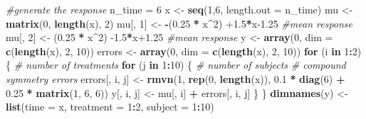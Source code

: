 \documentclass[
]{article}
\newenvironment{Shaded}{\begin{snugshade}}{\end{snugshade}}
\newcommand{\CommentTok}[1]{\textcolor[rgb]{0.56,0.35,0.01}{\textit{#1}}}
\newcommand{\ControlFlowTok}[1]{\textcolor[rgb]{0.13,0.29,0.53}{\textbf{#1}}}
\newcommand{\DataTypeTok}[1]{\textcolor[rgb]{0.13,0.29,0.53}{#1}}
\newcommand{\DecValTok}[1]{\textcolor[rgb]{0.00,0.00,0.81}{#1}}
\newcommand{\FloatTok}[1]{\textcolor[rgb]{0.00,0.00,0.81}{#1}}
\newcommand{\KeywordTok}[1]{\textcolor[rgb]{0.13,0.29,0.53}{\textbf{#1}}}
\newcommand{\NormalTok}[1]{#1}
\newcommand{\OperatorTok}[1]{\textcolor[rgb]{0.81,0.36,0.00}{\textbf{#1}}}
\newcommand{\StringTok}[1]{\textcolor[rgb]{0.31,0.60,0.02}{#1}}
\begin{document}
\begin{Shaded}
\begin{Highlighting}[]
\CommentTok{#generate the response}
\NormalTok{n_time =}\StringTok{ }\DecValTok{6}
\NormalTok{ x <-}\StringTok{ }\KeywordTok{seq}\NormalTok{(}\DecValTok{1}\NormalTok{,}\DecValTok{6}\NormalTok{, }\DataTypeTok{length.out =}\NormalTok{ n_time)}
\NormalTok{ mu <-}\StringTok{ }\KeywordTok{matrix}\NormalTok{(}\DecValTok{0}\NormalTok{, }\KeywordTok{length}\NormalTok{(x), }\DecValTok{2}\NormalTok{)}
\NormalTok{ mu[, }\DecValTok{1}\NormalTok{] <-}\StringTok{  }\OperatorTok{-}\NormalTok{(}\FloatTok{0.25} \OperatorTok{*}\StringTok{ }\NormalTok{x}\OperatorTok{^}\DecValTok{2}\NormalTok{) }\FloatTok{+1.5}\OperatorTok{*}\NormalTok{x}\FloatTok{-1.25} \CommentTok{#mean response}
\NormalTok{ mu[, }\DecValTok{2}\NormalTok{] <-}\StringTok{ }\NormalTok{(}\FloatTok{0.25} \OperatorTok{*}\StringTok{ }\NormalTok{x}\OperatorTok{^}\DecValTok{2}\NormalTok{) }\FloatTok{-1.5}\OperatorTok{*}\NormalTok{x}\FloatTok{+1.25} \CommentTok{#mean response}
\NormalTok{ y <-}\StringTok{ }\KeywordTok{array}\NormalTok{(}\DecValTok{0}\NormalTok{, }\DataTypeTok{dim =} \KeywordTok{c}\NormalTok{(}\KeywordTok{length}\NormalTok{(x), }\DecValTok{2}\NormalTok{, }\DecValTok{10}\NormalTok{))}
\NormalTok{ errors <-}\StringTok{ }\KeywordTok{array}\NormalTok{(}\DecValTok{0}\NormalTok{, }\DataTypeTok{dim =} \KeywordTok{c}\NormalTok{(}\KeywordTok{length}\NormalTok{(x), }\DecValTok{2}\NormalTok{, }\DecValTok{10}\NormalTok{))}
 \ControlFlowTok{for}\NormalTok{ (i }\ControlFlowTok{in} \DecValTok{1}\OperatorTok{:}\DecValTok{2}\NormalTok{) \{     }\CommentTok{# number of treatments}
     \ControlFlowTok{for}\NormalTok{ (j }\ControlFlowTok{in} \DecValTok{1}\OperatorTok{:}\DecValTok{10}\NormalTok{) \{  }\CommentTok{# number of subjects}
         \CommentTok{# compound symmetry errors}
\NormalTok{         errors[, i, j] <-}\StringTok{ }\KeywordTok{rmvn}\NormalTok{(}\DecValTok{1}\NormalTok{, }\KeywordTok{rep}\NormalTok{(}\DecValTok{0}\NormalTok{, }\KeywordTok{length}\NormalTok{(x)), }\FloatTok{0.1} \OperatorTok{*}\StringTok{ }\KeywordTok{diag}\NormalTok{(}\DecValTok{6}\NormalTok{) }\OperatorTok{+}\StringTok{ }\FloatTok{0.25} \OperatorTok{*}\StringTok{ }\KeywordTok{matrix}\NormalTok{(}\DecValTok{1}\NormalTok{, }\DecValTok{6}\NormalTok{, }\DecValTok{6}\NormalTok{))}
\NormalTok{         y[, i, j] <-}\StringTok{ }\NormalTok{mu[, i] }\OperatorTok{+}\StringTok{ }\NormalTok{errors[, i, j]}
\NormalTok{     \}}
\NormalTok{ \}}
  \KeywordTok{dimnames}\NormalTok{(y) <-}\StringTok{ }\KeywordTok{list}\NormalTok{(}\DataTypeTok{time =}\NormalTok{ x, }\DataTypeTok{treatment =} \DecValTok{1}\OperatorTok{:}\DecValTok{2}\NormalTok{, }\DataTypeTok{subject =} \DecValTok{1}\OperatorTok{:}\DecValTok{10}\NormalTok{)}

\end{Highlighting}
\end{Shaded}
\end{document}
